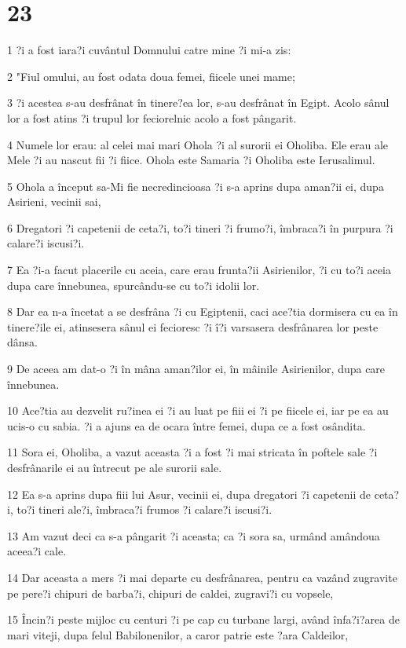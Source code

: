 \chapter{23}

\par 1 ?i a fost iara?i cuvântul Domnului catre mine ?i mi-a zis:
\par 2 "Fiul omului, au fost odata doua femei, fiicele unei mame;
\par 3 ?i acestea s-au desfrânat în tinere?ea lor, s-au desfrânat în Egipt. Acolo sânul lor a fost atins ?i trupul lor feciorelnic acolo a fost pângarit.
\par 4 Numele lor erau: al celei mai mari Ohola ?i al surorii ei Oholiba. Ele erau ale Mele ?i au nascut fii ?i fiice. Ohola este Samaria ?i Oholiba este Ierusalimul.
\par 5 Ohola a început sa-Mi fie necredincioasa ?i s-a aprins dupa aman?ii ei, dupa Asirieni, vecinii sai,
\par 6 Dregatori ?i capetenii de ceta?i, to?i tineri ?i frumo?i, îmbraca?i în purpura ?i calare?i iscusi?i.
\par 7 Ea ?i-a facut placerile cu aceia, care erau frunta?ii Asirienilor, ?i cu to?i aceia dupa care înnebunea, spurcându-se cu to?i idolii lor.
\par 8 Dar ea n-a încetat a se desfrâna ?i cu Egiptenii, caci ace?tia dormisera cu ea în tinere?ile ei, atinsesera sânul ei fecioresc ?i î?i varsasera desfrânarea lor peste dânsa.
\par 9 De aceea am dat-o ?i în mâna aman?ilor ei, în mâinile Asirienilor, dupa care înnebunea.
\par 10 Ace?tia au dezvelit ru?inea ei ?i au luat pe fiii ei ?i pe fiicele ei, iar pe ea au ucis-o cu sabia. ?i a ajuns ea de ocara între femei, dupa ce a fost osândita.
\par 11 Sora ei, Oholiba, a vazut aceasta ?i a fost ?i mai stricata în poftele sale ?i desfrânarile ei au întrecut pe ale surorii sale.
\par 12 Ea s-a aprins dupa fiii lui Asur, vecinii ei, dupa dregatori ?i capetenii de ceta?i, to?i tineri ale?i, îmbraca?i frumos ?i calare?i iscusi?i.
\par 13 Am vazut deci ca s-a pângarit ?i aceasta; ca ?i sora sa, urmând amândoua aceea?i cale.
\par 14 Dar aceasta a mers ?i mai departe cu desfrânarea, pentru ca vazând zugravite pe pere?i chipuri de barba?i, chipuri de caldei, zugravi?i cu vopsele,
\par 15 Încin?i peste mijloc cu centuri ?i pe cap cu turbane largi, având înfa?i?area de mari viteji, dupa felul Babilonenilor, a caror patrie este ?ara Caldeilor,

